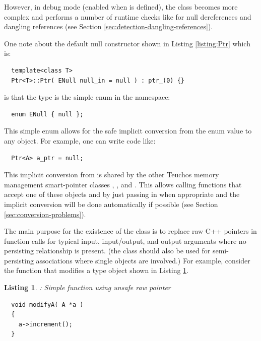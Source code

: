 \documentclass[pdf,ps2pdf,11pt]{SANDreport}
\newtheorem{listing}{Listing}
\begin{document}
However, in debug mode (enabled when {} is defined), the
{} class becomes more complex and performs a number of runtime checks
like for null dereferences and dangling references (see Section
{}\ref{sec:detection-dangling-references}).

One note about the default null constructor shown in Listing
{}\ref{listing:Ptr} which is:

{\small\begin{verbatim}
  template<class T>
  Ptr<T>::Ptr( ENull null_in = null ) : ptr_(0) {}
\end{verbatim}}

{}\noindent{}is that the type {} is the simple enum in
the {} namespace:

{\small\begin{verbatim}
  enum ENull { null };
\end{verbatim}}

This simple enum allows for the safe implicit conversion from the enum
value {} to any {} object.  For example, one can
write code like:

{\small\begin{verbatim}
  Ptr<A> a_ptr = null;
\end{verbatim}}

This implicit conversion from {} is shared by the other Teuchos
memory management smart-pointer classes {}, {},
and {}.  This allows calling functions that accept one of
these objects and by just passing in {} when appropriate and the
implicit conversion will be done automatically if possible (see Section
{}\ref{sec:conversion-problems}).

The main purpose for the existence of the {} class is to
replace raw C++ pointers in function calls for typical input,
input/output, and output arguments where no persisting relationship is
present.  (the class {} should also be used for
semi-persisting associations where single objects are involved.)  For
example, consider the function that modifies a type {}
object shown in Listing {}\ref{listing:modifyA-rawPtr}.

{}\begin{listing}: Simple function using unsafe raw pointer
\label{listing:modifyA-rawPtr}
{\small\begin{verbatim}
  void modifyA( A *a )
  {
    a->increment();
  }
\end{verbatim}}
\end{listing}
\end{document}
